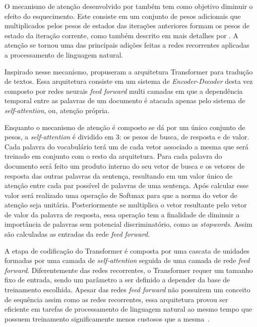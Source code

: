 O mecanismo de atenção desenvolvido por \citet{bahdanau14} também tem como
objetivo diminuir o efeito do esquecimento.
Este consiste em um conjunto de pesos adicionais que multiplicados pelos pesos
de estados das iterações anteriores formam os pesos de estado da iteração
corrente, como também descrito em mais detalhes por \citet{luong15}.
A atenção se tornou uma das principais adições feitas a redes recorrentes
aplicadas a processamento de linguagem natural.

Inspirado nesse mecanismo, \citet{vaswani17} propuseram a arquitetura
Transformer para tradução de textos.
Essa arquitetura consiste em um sistema de \textit{Encoder-Decoder} desta vez
composto por redes neurais \textit{feed forward} multi camadas em que a
dependência temporal entre as palavras de um documento é atacada apenas pelo
sistema de \textit{self-attention}, ou, atenção própria.

Enquanto o mecanismo de atenção é composto se dá por um único conjunto de pesos,
a \textit{self-attention} é dividido em 3: os pesos de busca, de resposta e de
valor.
Cada palavra do vocabulário terá um de cada vetor associado a mesma que será
treinado em conjunto com o resto da arquitetura.
Para cada palavra do documento será feito um produto interno do seu vetor de
busca e os vetores de resposta das outras palavras da sentença, resultando em um
valor único de atenção entre cada par possível de palavras de uma sentença.
Após calcular esse valor será realizado uma operação de Softmax para que a norma
do vetor de atenção seja unitária.
Posteriormente se multiplica o vetor resultante pelo vetor de valor da palavra
de resposta, essa operação tem a finalidade de diminuir a importância de
palavras sem potencial discriminatório, como as \textit{stopwords}.
Assim são calculadas as entradas da rede \textit{feed forward}.


A etapa de codificação do Transformer é composta por uma cascata de unidades
formadas por uma camada de \textit{self-attention} seguida de uma camada de
rede \textit{feed forward}.
Diferentemente das redes recorrentes, o Transformer requer um tamanho fixo de
entrada, sendo um parâmetro a ser definido a depender da base de treinamento
escolhida.
Apesar das redes \textit{feed forward} não possuirem um conceito de sequência
assim como as redes recorrentes, essa arquitetura provou ser eficiente em
tarefas de processamento de linguagem natural ao mesmo tempo que possuem
treinamento significamente menos custosos que a mesma~\cite{vaswani17}.

